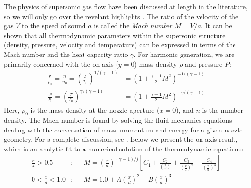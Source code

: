 The physics of supersonic gas flow have been discussed at length in the literature, so we will only go over the revelant highlights \cite{millerFreeJetSources1988,joustenHandbookVacuumTechnology2016}. The ratio of the velocity of the gas $V$ to the speed of sound $a$ is called the \textit{Mach number} $M=V/a$. It can be shown that all thermodynamic parameters within the supersonic structure (density, pressure, velocity and temperature) can be expressed in terms of the Mach number and the heat capacity ratio $\gamma$. For harmonic generation, we are primarily concerned with the on-axis ($y=0$) mass density $\rho$ and pressure $P$:
\begin{subequations}
	\label{eqn:mach_properties}
	\begin{align}
	\frac{\rho}{\rho_0} = \frac{n}{n_0} = \left(\frac{T}{T_0}\right)^{1/(\gamma-1)} &= \left(  1 + \frac{\gamma-1}{2} M^2 \right)^{-1/(\gamma-1)} \label{eqn:mach_rho} \\
	\frac{P}{P_0} = \left(\frac{T}{T_0}\right)^{\gamma/(\gamma-1)} &= \left(  1 + \frac{\gamma-1}{2} M^2 \right)^{-\gamma/(\gamma-1)} \label{eqn:mach_pressure}
	\end{align}
\end{subequations}
Here, $\rho_0$ is the mass density at the nozzle aperture ($x=0$), and $n$ is the number density. The Mach number is found by solving the fluid mechanics equations dealing with the conversation of mass, momentum and energy for a given nozzle geometry. For a complete discussion, see \cite{millerFreeJetSources1988}. Below we present the on-axis result, which is an analytic fit to a numerical solution of the thermodynamic equations:
\begin{subequations}
	\label{eqn:Scoles_centerline2.2}
	\begin{align}
	\frac{x}{d} > 0.5&: &&M = \left( \frac{x}{d} \right)^{(\gamma-1)/j} \left[ C_1 + \frac{C_2}{\left(\frac{x}{d}\right)} + \frac{C_3}{\left(\frac{x}{d}\right)^2} + \frac{C_4}{\left(\frac{x}{d}\right)^3} \right] \label{eqn:Scoles_centerline1} \\
	0 < \frac{x}{d} < 1.0&: &&M = 1.0 + A \left( \frac{x}{d} \right)^2 + B \left( \frac{x}{d} \right)^3 \label{eqn:Scoles_centerline2}
	\end{align}
\end{subequations}
